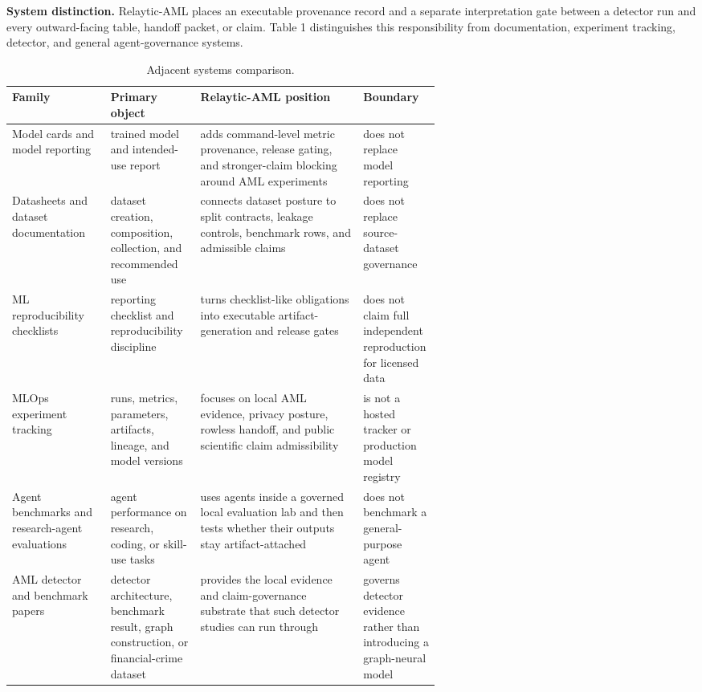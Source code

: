 \documentclass[11pt]{article}
\begin{document}
\textbf{System distinction.} Relaytic-AML places an executable provenance record and a separate interpretation gate between a detector run and every outward-facing table, handoff packet, or claim. Table 1 distinguishes this responsibility from documentation, experiment tracking, detector, and general agent-governance systems.

\begin{table}[p]
\centering
\caption{Adjacent systems comparison.}
\begin{minipage}{\linewidth}
\small
\setlength{\tabcolsep}{3pt}
\renewcommand{\arraystretch}{1.16}
\begin{tabularx}{\linewidth}{@{}>{\raggedright\arraybackslash}p{0.23\linewidth} >{\raggedright\arraybackslash}p{0.21\linewidth} >{\raggedright\arraybackslash}X >{\raggedright\arraybackslash}p{0.18\linewidth}@{}}
\toprule
Family & Primary object & Relaytic-AML position & Boundary \\
\midrule
Model cards and model reporting \citep{mitchell2019modelcards} & trained model and intended-use report & adds command-level metric provenance, release gating, and stronger-claim blocking around AML experiments & does not replace model reporting \\
Datasheets and dataset documentation \citep{gebru2021datasheets} & dataset creation, composition, collection, and recommended use & connects dataset posture to split contracts, leakage controls, benchmark rows, and admissible claims & does not replace source-dataset governance \\
ML reproducibility checklists \citep{pineau2021reproducibility} & reporting checklist and reproducibility discipline & turns checklist-like obligations into executable artifact-generation and release gates & does not claim full independent reproduction for licensed data \\
MLOps experiment tracking \citep{zaharia2018mlflow} & runs, metrics, parameters, artifacts, lineage, and model versions & focuses on local AML evidence, privacy posture, rowless handoff, and public scientific claim admissibility & is not a hosted tracker or production model registry \\
Agent benchmarks and research-agent evaluations \citep{chen2025mlrbench,starace2025paperbench} & agent performance on research, coding, or skill-use tasks & uses agents inside a governed local evaluation lab and then tests whether their outputs stay artifact-attached & does not benchmark a general-purpose agent \\
AML detector and benchmark papers \citep{weber2019elliptic,bellei2024elliptic2} & detector architecture, benchmark result, graph construction, or financial-crime dataset & provides the local evidence and claim-governance substrate that such detector studies can run through & governs detector evidence rather than introducing a graph-neural model \\

\end{tabularx}
\end{minipage}
\end{table}
\end{document}
